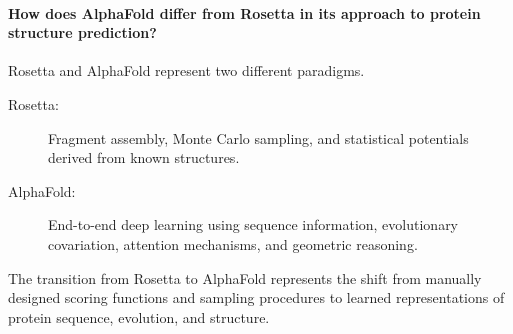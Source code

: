 \paragraph{How does AlphaFold differ from Rosetta in its approach to protein structure prediction?}
Rosetta and AlphaFold represent two different paradigms.
\begin{description}
    \item[Rosetta:] Fragment assembly, Monte Carlo sampling, and statistical potentials derived from known structures.
    \item[AlphaFold:] End-to-end deep learning using sequence information, evolutionary covariation, attention mechanisms, and geometric reasoning.
\end{description}

The transition from Rosetta to AlphaFold represents the shift from manually designed scoring functions and sampling procedures to learned representations of protein sequence, evolution, and structure.